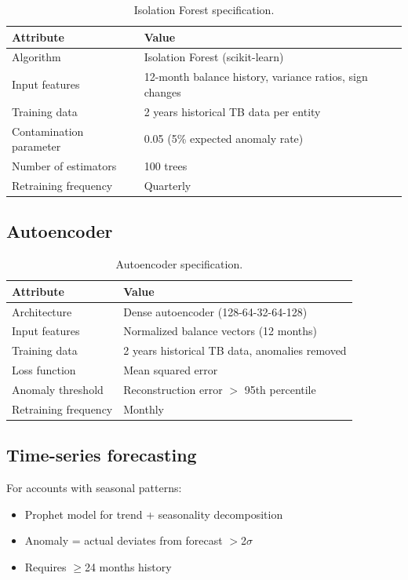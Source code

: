 \begin{table}[htbp]
\centering
\caption{Isolation Forest specification.}
\footnotesize
\begin{tabularx}{\linewidth}{@{}l X@{}}
\toprule
\textbf{Attribute} & \textbf{Value} \\ \midrule
Algorithm & Isolation Forest (scikit-learn) \\
Input features & 12-month balance history, variance ratios, sign changes \\
Training data & 2 years historical TB data per entity \\
Contamination parameter & 0.05 (5\% expected anomaly rate) \\
Number of estimators & 100 trees \\
Retraining frequency & Quarterly \\
\bottomrule
\end{tabularx}
\end{table}

\subsection{Autoencoder}

\begin{table}[htbp]
\centering
\caption{Autoencoder specification.}
\footnotesize
\begin{tabularx}{\linewidth}{@{}l X@{}}
\toprule
\textbf{Attribute} & \textbf{Value} \\ \midrule
Architecture & Dense autoencoder (128-64-32-64-128) \\
Input features & Normalized balance vectors (12 months) \\
Training data & 2 years historical TB data, anomalies removed \\
Loss function & Mean squared error \\
Anomaly threshold & Reconstruction error $>$ 95th percentile \\
Retraining frequency & Monthly \\
\bottomrule
\end{tabularx}
\end{table}

\subsection{Time-series forecasting}

For accounts with seasonal patterns:
\begin{itemize}
  \item Prophet model for trend + seasonality decomposition
  \item Anomaly = actual deviates from forecast $>$2$\sigma$
  \item Requires $\geq$24 months history
\end{itemize}

